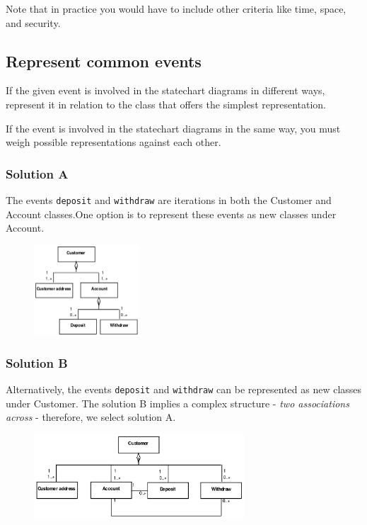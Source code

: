 Note that in practice you would have to include other criteria like time, space, and security.

\subsection{Represent common events}
If the given event is involved in the statechart diagrams in different ways, represent it in relation to the class that offers the simplest representation. 

If the event is involved in the statechart diagrams in the same way, you must weigh possible representations against each other.

\subsubsection{Solution A}
The events \texttt{deposit} and \texttt{withdraw} are iterations in both the Customer and Account classes.One option is to represent these events as new classes under Account.

\begin{figure}[H]
    \centering
    \includegraphics[width=0.35\textwidth]{figures/modelcomponentsolutiona.png}
\end{figure}

\subsubsection{Solution B}
Alternatively, the events \texttt{deposit} and \texttt{withdraw} can be represented as new classes under Customer. The solution B implies a complex structure - \textit{two associations across} - therefore, we select solution A.

\begin{figure}[H]
    \centering
    \includegraphics[width=0.7\textwidth]{figures/modelcomponentsolutionb.png}
\end{figure}

